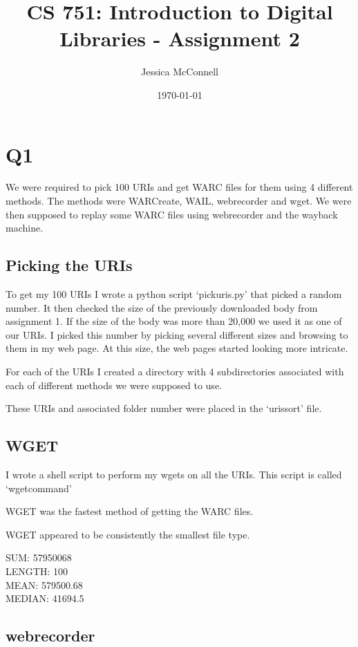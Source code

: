\documentclass[12pt]{article}
\title{CS 751: Introduction to Digital Libraries - Assignment 2}
\author{Jessica McConnell}
\date{\today}
\begin{document}
\maketitle

\section{Q1}

We were required to pick 100 URIs and get WARC files for them using 4 different methods.  The methods were WARCreate, WAIL, webrecorder and wget.  We were then supposed to replay some WARC files using webrecorder and the wayback machine.

\subsection{Picking the URIs}

To get my 100 URIs I wrote a python script `pickuris.py' that picked a random number.  It then checked the size of the previously downloaded body from assignment 1. If the size of the body was more than 20,000 we used it as one of our URIs.  I picked this number by picking several different sizes and browsing to them in my web page.  At this size, the web pages started looking more intricate.

For each of the URIs I created a directory with 4 subdirectories associated with each of different methods we were supposed to use.

These URIs and associated folder number were placed in the `urissort' file.

\subsection{WGET}

I wrote a shell script to perform my wgets on all the URIs.  This script is called `wgetcommand'

WGET was the fastest method of getting the WARC files.

WGET appeared to be consistently the smallest file type.

\begin{center}
\noindent SUM:  57950068\\
LENGTH:  100\\
MEAN:  579500.68\\
MEDIAN:  41694.5
\end{center}

\subsection{webrecorder}
\end{document}
